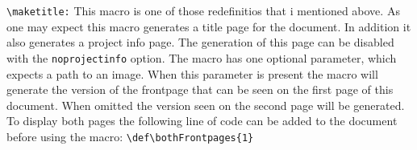 \documentclass[11pt]{../aau-report}
\newcommand\mn[1]{\texttt{\textbackslash{}#1}}
\begin{document}
\mn{maketitle:} This macro is one of those redefinitios that i mentioned above. As one may expect this macro generates a title page for the document. In addition it also generates a project info page. The generation of this page can be disabled with the \texttt{noprojectinfo} option.
The macro has one optional parameter, which expects a path to an image. When this parameter is present the macro will generate the version of the frontpage that can be seen on the first page of this document. When omitted the version seen on the second page will be generated.
To display both pages the following line of code can be added to the document before using the macro: \verb|\def\bothFrontpages{1}|
\end{document}
